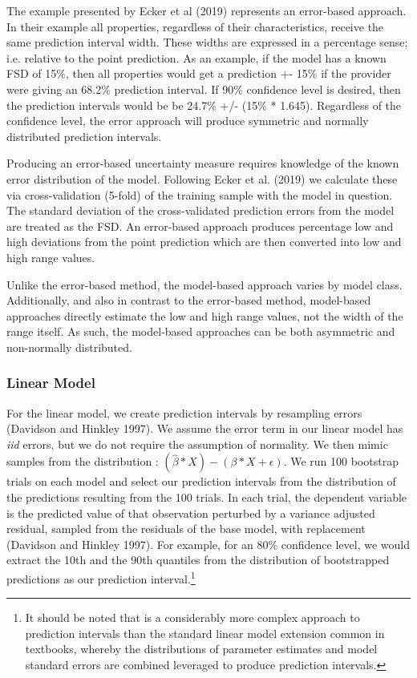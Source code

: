 \documentclass[colTwo]{anon}
\theoremstyle{definition}
\begin{document}
The example presented by Ecker et al (2019) represents an error-based approach. In their example all properties, regardless of their characteristics, receive the same prediction interval width.  These widths are expressed in a percentage sense; i.e. relative to the point prediction. As an example,  if the model has a known FSD of 15\%, then all properties would get a prediction +- 15\% if the provider were giving an 68.2\% prediction interval.  If 90\% confidence level is desired, then the prediction intervals would be be 24.7\% +/- (15\% * 1.645).  Regardless of the confidence level, the error approach will produce symmetric and normally distributed prediction intervals. 

Producing an error-based uncertainty measure requires knowledge of the known error distribution of the model.  Following Ecker et al. (2019) we calculate these via cross-validation (5-fold) of the training sample with the model in question.  The standard deviation of the cross-validated prediction errors from the model are treated as the FSD.  An error-based approach produces percentage low and high deviations from the point prediction which are then converted into low and high range values.  

Unlike the error-based method, the model-based approach varies by model class. Additionally, and also in contrast to the error-based method, model-based approaches directly estimate the low and high range values, not the width of the range itself. As such, the model-based approaches can be both asymmetric and non-normally distributed. 

\subsubsection{Linear Model}

For the linear model, we create prediction intervals by resampling errors (Davidson and Hinkley 1997). We assume the error term in our linear model has \textit{iid} errors, but we do not require the assumption of normality. We then mimic samples from the distribution : \((\widehat{\beta}*X) - (\beta*X + \epsilon)\). We run 100 bootstrap trials on each model and select our prediction intervals from the distribution of the predictions resulting from the 100 trials. In each trial, the dependent variable is the predicted value of that observation perturbed by a variance adjusted residual, sampled from the residuals of the base model, with replacement (Davidson and Hinkley 1997).  For example, for an 80\% confidence level, we would extract the 10th and the 90th quantiles from the distribution of bootstrapped predictions as our prediction interval.\footnote{It should be noted that is a considerably more complex approach to prediction intervals than the standard linear model extension common in textbooks, whereby the distributions of parameter estimates and model standard errors are combined leveraged to produce prediction intervals.}  
\end{document}

